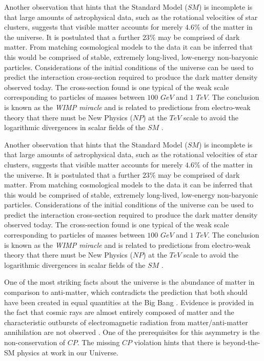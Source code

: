 \documentclass[a4paper,12pt]{article}
\begin{document}
Another observation that hints that the Standard Model ($SM$) is incomplete is that large amounts of astrophysical data, such as the rotational velocities of star clusters, suggests that visible matter accounts for merely $4.6\%$ of the matter in the universe. It is postulated that a further $23\%$ may be comprised of dark matter. From matching cosmological models to the data it can be inferred that this would be comprised of stable, extremely long-lived, low-energy non-baryonic particles. Considerations of the initial conditions of the universe can be used to predict the interaction cross-section required to produce the dark matter density observed today. The cross-section found is one typical of the weak scale corresponding to particles of masses between $100$ $ GeV$ and $1$ $ TeV$. The conclusion is known as the {\it WIMP miracle} and is related to predictions from electro-weak theory that there must be New Physics ($NP$) at the $TeV$ scale to avoid the logarithmic divergences in scalar fields of the $SM$ \cite[p. 12]{paper1}. 


Another observation that hints that the Standard Model ($SM$) is incomplete is that large amounts of astrophysical data, such as the rotational velocities of star clusters, suggests that visible matter accounts for merely $4.6\%$ of the matter in the universe. It is postulated that a further $23\%$ may be comprised of dark matter. From matching cosmological models to the data it can be inferred that this would be comprised of stable, extremely long-lived, low-energy non-baryonic particles. Considerations of the initial conditions of the universe can be used to predict the interaction cross-section required to produce the dark matter density observed today. The cross-section found is one typical of the weak scale corresponding to particles of masses between $100$ $ GeV$ and $1$ $ TeV$. The conclusion is known as the {\it WIMP miracle} and is related to predictions from electro-weak theory that there must be New Physics ($NP$) at the $TeV$ scale to avoid the logarithmic divergences in scalar fields of the $SM$ \cite[p. 12]{paper1}. 

One of the most striking facts about the universe is the abundance of matter in comparison to anti-matter, which contradicts the prediction that both should have been created in equal quantities at the Big Bang \cite{paper35,paper36}. Evidence is provided  in the fact that cosmic rays are almost entirely composed of matter and the characteristic outbursts of electromagnetic radiation from matter/anti-matter annihilation are not observed \cite[p. 323]{paper35}. One of the prerequisites for this asymmetry is the non-conservation of $CP$. The missing $CP$ violation hints that there is beyond-the-SM physics at work in our Universe\cite[p. 12]{paper1}.
\end{document}
